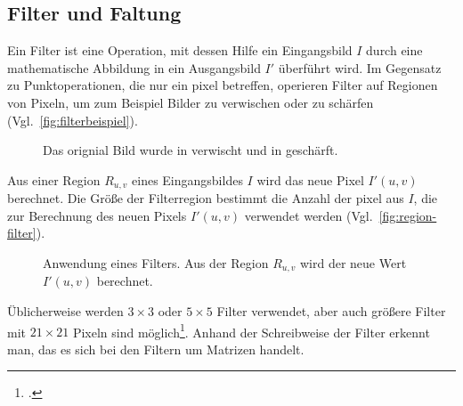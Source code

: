 \subsection{Filter und Faltung} %
\label{sub:filter}
Ein Filter ist eine Operation, mit dessen Hilfe ein Eingangsbild $I$ durch eine mathematische Abbildung in ein
 Ausgangsbild $I'$ überführt wird. Im Gegensatz zu Punktoperationen, die nur ein \gls{pixel} betreffen, operieren
 Filter auf Regionen von Pixeln, um zum Beispiel Bilder zu verwischen oder zu schärfen
 (Vgl.~\autoref{fig:filterbeispiel}).
\begin{figure}[!ht]
	\centering
	\caption{Das orignial Bild  wurde in
	  verwischt und in  geschärft.}
	\label{fig:filterbeispiel}
\end{figure}

Aus einer Region $R_{u,v}$ eines Eingangsbildes $I$ wird das neue Pixel $I'(u,v)$ berechnet. Die Größe der
 Filterregion bestimmt die Anzahl der \gls{pixel} aus $I$, die zur Berechnung des neuen Pixels $I'(u,v)$ verwendet
 werden (Vgl.~\autoref{fig:region-filter}).
\begin{figure}[!ht]
	\centering
	
	\caption{Anwendung eines Filters. Aus der Region $R_{u,v}$ wird der neue Wert $I'(u,v)$ berechnet.}
	\label{fig:region-filter}
\end{figure}
Üblicherweise werden $3 \times 3$ oder $5 \times 5$ Filter verwendet, aber auch größere Filter mit $21 \times 21$
 Pixeln sind möglich\footcite[Vgl.][S.~90--91]{burger05}. Anhand der Schreibweise der Filter erkennt man, das es sich
 bei den Filtern um Matrizen handelt.

